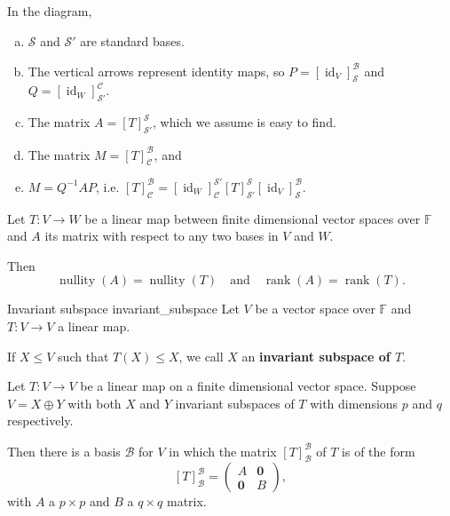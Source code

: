 In the diagram,
\begin{enumerate}[a)]
	\item $\mathcal{S}$ and $\mathcal{S}'$ are standard bases.
	\item The vertical arrows represent identity maps, so $P = [\operatorname{id}_V]_\mathcal{S}^\mathcal{B}$ and $Q = [\operatorname{id}_W]_{\mathcal{S}'}^\mathcal{C}$.
	\item The matrix $A = [T]_{\mathcal{S}'}^\mathcal{S}$, which we assume is easy to find.
	\item The matrix $M = [T]_\mathcal{C}^\mathcal{B}$, and
	\item $M = Q^{-1} A P$, i.e. $[T]_\mathcal{C}^\mathcal{B} = [\operatorname{id}_W]_\mathcal{C}^{\mathcal{S}'} [T]_{\mathcal{S}'}^\mathcal{S} [\operatorname{id}_V]_\mathcal{S}^\mathcal{B}$.
\end{enumerate}

\begin{lemma}{\cite{math2601_notes}}{}
	Let $T : V \to W$ be a linear map between finite dimensional vector spaces over $\mathbb{F}$ and $A$ its matrix with respect to any two bases in $V$ and $W$.

	Then
	$$ \operatorname{nullity} (A) = \operatorname{nullity} (T) \quad \text{and} \quad \operatorname{rank} (A) = \operatorname{rank} (T) . $$
\end{lemma}

\begin{definition}{Invariant subspace \cite{math2601_notes}}{invariant_subspace}
	Let $V$ be a vector space over $\mathbb{F}$ and $T : V \to V$ a linear map.

	If $X \leq V$ such that $T(X) \leq X$, we call $X$ an \textbf{invariant subspace of $T$}.
\end{definition}

\begin{theorem}{\cite{math2601_notes}}{}
	Let $T : V \to V$ be a linear map on a finite dimensional vector space. Suppose $V = X \oplus Y$ with both $X$ and $Y$ invariant subspaces of $T$ with dimensions $p$ and $q$ respectively.

	Then there is a basis $\mathcal{B}$ for $V$ in which the matrix $[T]_\mathcal{B}^\mathcal{B}$ of $T$ is of the form
	$$ 
		[T]_\mathcal{B}^\mathcal{B} =
		\begin{pmatrix}
			A & \mathbf{0} \\
			\mathbf{0} & B
		\end{pmatrix},
	$$
	with $A$ a $p \times p$ and $B$ a $q \times q$ matrix.
\end{theorem}

